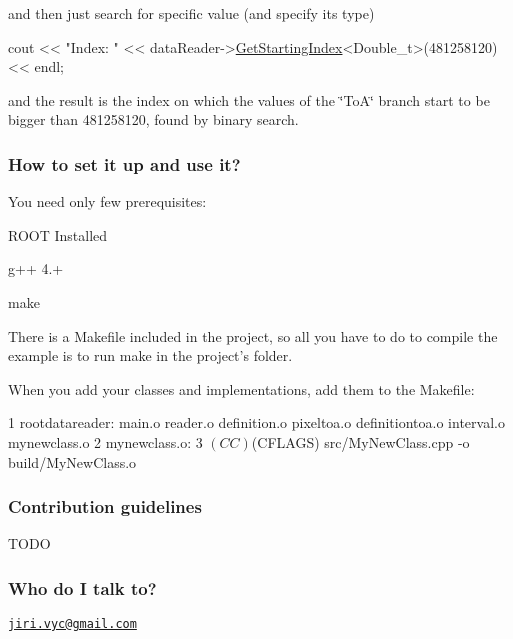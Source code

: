 and then just search for specific value (and specify its type)


\begin{DoxyCode}
cout << \textcolor{stringliteral}{"Index: "} << dataReader->\hyperlink{classRootDataReader_a04d8033b9761cc8c673af9bb96adfc03}{GetStartingIndex}<Double\_t>(481258120) << endl;
\end{DoxyCode}


and the result is the index on which the values of the \char`\"{}\+To\+A\char`\"{} branch start to be bigger than 481258120, found by binary search.

\subsubsection*{How to set it up and use it?}

You need only few prerequisites\+:


\begin{DoxyItemize}
\item R\+O\+O\+T Installed
\item g++ 4.+
\item make
\end{DoxyItemize}

There is a Makefile included in the project, so all you have to do to compile the example is to run {\ttfamily make} in the project's folder.

When you add your classes and implementations, add them to the Makefile\+:


\begin{DoxyCode}
1 rootdatareader: main.o reader.o definition.o pixeltoa.o definitiontoa.o interval.o mynewclass.o
2 mynewclass.o:
3     $(CC) $(CFLAGS) src/MyNewClass.cpp -o build/MyNewClass.o
\end{DoxyCode}


\subsubsection*{Contribution guidelines}


\begin{DoxyItemize}
\item T\+O\+D\+O
\end{DoxyItemize}

\subsubsection*{Who do I talk to?}

\href{mailto:jiri.vyc@gmail.com}{\tt jiri.\+vyc@gmail.\+com} 